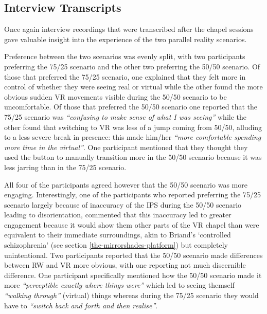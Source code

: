 
\subsection{Interview Transcripts}

Once again interview recordings that were transcribed after the chapel sessions gave valuable insight into the experience of the two parallel reality scenarios.

Preference between the two scenarios was evenly split, with two participants preferring the 75/25 scenario and the other two preferring the 50/50 scenario. Of those that preferred the 75/25 scenario, one explained that they felt more in control of whether they were seeing real or virtual while the other found the more obvious sudden VR movements visible during the 50/50 scenario to be uncomfortable. Of those that preferred the 50/50 scenario one reported that the 75/25 scenario was \textit{``confusing to make sense of what I was seeing''} while the other found that switching to VR was less of a jump coming from 50/50, alluding to a less severe break in presence: this made him/her \textit{``more comfortable spending more time in the virtual''}. One participant mentioned that they thought they used the button to manually transition more in the 50/50 scenario because it was less jarring than in the 75/25 scenario.

All four of the participants agreed however that the 50/50 scenario was more engaging. Interestingly, one of the participants who reported preferring the 75/25 scenario largely because of inaccuracy of the IPS during the 50/50 scenario leading to disorientation, commented that this inaccuracy led to greater engagement because it would show them other parts of the VR chapel than were equivalent to their immediate surroundings, akin to Briand's `controlled schizophrenia' (see section \ref{the-mirrorshades-platform}) but completely unintentional. Two participants reported that the 50/50 scenario made differences between RW and VR more obvious, with one reporting not much discernible difference. One participant specifically mentioned how the 50/50 scenario made it more \textit{``perceptible exactly where things were''} which led to seeing themself \textit{``walking through''} (virtual) things whereas during the 75/25 scenario they would have to \textit{``switch back and forth and then realise''}.

